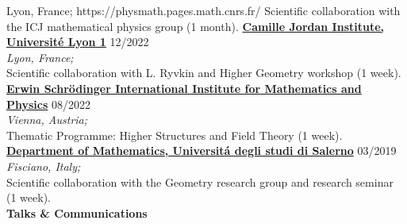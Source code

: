 \documentclass[a4paper]{article}
\newcommand{\blockNp}[1]{\newpage \textbf{\Large #1} \vspace{0.2cm}}
\newcommand{\voice}[5]{\href{#4}{\textbf{#1}} \hfill #2 \\ \textit{#3} \\ {\small #5} \vspace{0.2cm} \\}
\begin{document}
		{Lyon, France;}
		{https://physmath.pages.math.cnrs.fr/}       
		{Scientific collaboration with the ICJ mathematical physics group (1 month).}
	\voice{Camille Jordan Institute, Université Lyon 1}
		{12/2022}
		{Lyon, France;}
		{https://physmath.pages.math.cnrs.fr/}       
		{Scientific collaboration with L. Ryvkin and Higher Geometry workshop (1 week).}
	\voice{Erwin Schrödinger International Institute for Mathematics and Physics}
		{08/2022}
		{Vienna, Austria;}
		{https://www.esi.ac.at/events/e430/}       
		{Thematic Programme: Higher Structures and Field Theory (1 week).}
	\voice{Department of Mathematics, Universit\'a degli studi di Salerno}
		{03/2019}
		{Fisciano, Italy;}
		{http://geometria.dipmat.unisa.it/events.html}       
		{Scientific collaboration with the Geometry research group and research seminar (1 week).\vspace{-2em}}
	
	\blockNp{Talks \& Communications}
\end{document}
